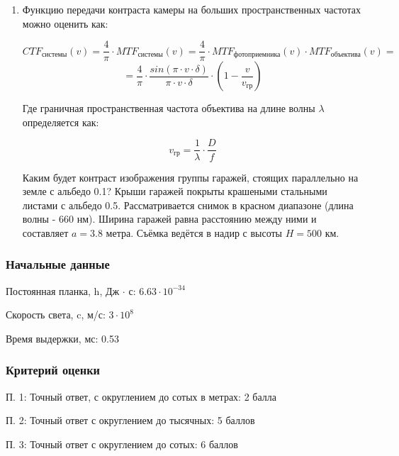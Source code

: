 \begin{enumerate}
\item Функцию передачи контраста камеры на больших пространственных частотах можно оценить как:

$$CTF_{\text{системы}}(v) = \frac{4}{\pi} \cdot MTF_{\text{системы}}(v) =
\frac{4}{\pi} \cdot MTF_{\text{фотоприемника}}(v) \cdot MTF_{\text{объектива}}(v) = $$
$$ = \frac{4}{\pi} \cdot \frac{sin(\pi \cdot v \cdot \delta)}{\pi \cdot v \cdot \delta} \cdot \left(1 - \frac{v}{v_{\text{гр}}} \right)$$
 
Где граничная пространственная частота объектива на длине волны $\lambda$ определяется как:
 
$$v_{\text{гр}} = \frac{1}{\lambda} \cdot \frac{D}{f}$$

Каким будет контраст изображения группы гаражей, стоящих параллельно на земле с 
альбедо 0.1? Крыши гаражей покрыты крашеными стальными листами с альбедо 0.5. 
Рассматривается снимок в красном диапазоне (длина волны - 660 нм). Ширина 
гаражей равна расстоянию между ними и составляет $a = 3.8$ метра. Съёмка ведётся в 
надир с высоты $H = 500$ км.

\end{enumerate}

\subsubsection*{Начальные данные}

Постоянная планка, h, Дж $\cdot$ с: $6.63 \cdot 10^{-34}$

Скорость света, c, м/с: $3 \cdot 10^8$

Время выдержки, мс: 0.53

\subsubsection*{Критерий оценки}

П. 1: Точный ответ, с округлением до сотых в метрах: 2 балла

П. 2: Точный ответ с округлением до тысячных: 5 баллов

П. 3: Точный ответ с округлением до сотых: 6 баллов

\solutionSection

